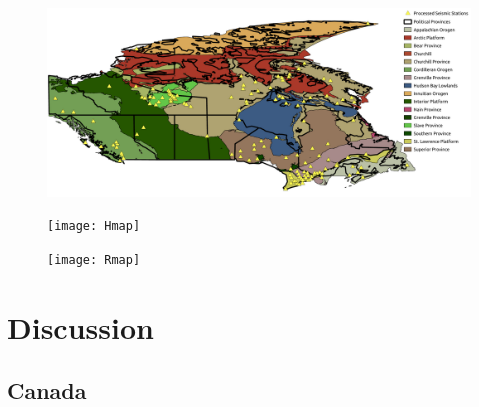 \documentclass[draft, 12pt]{article}
\begin{document}
\begin{figure}
  \centering
  \includegraphics[width=\textwidth]{stationMap}
  \caption{}
  \label{map:stationMap}
\end{figure}

\begin{figure}
  \centering
  \texttt{[image: Hmap]}
  \caption{}
  \label{map:Hmap}
\end{figure}

\begin{figure}
  \centering
  \texttt{[image: Rmap]}
  \caption{}
  \label{map:Rmap}
\end{figure}



\section{Discussion}
\subsection{Canada}
\end{document}
